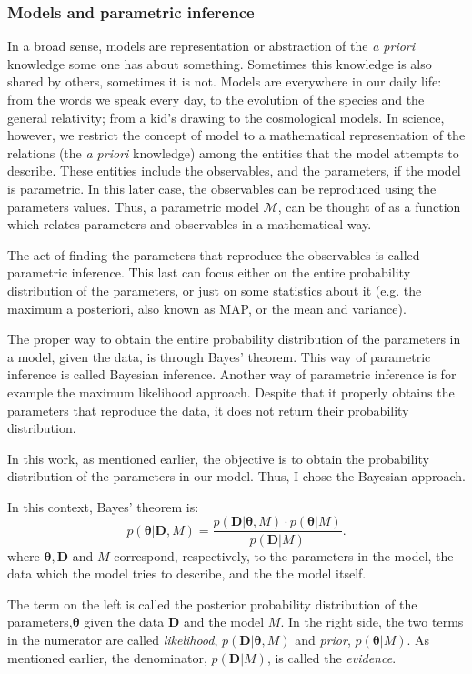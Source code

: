\subsubsection{Models and parametric inference}
In a broad sense, models are representation or abstraction of the \emph{a priori} knowledge some one has about something. Sometimes this knowledge is also shared by others, sometimes it is not. Models are everywhere in our daily life: from the words we speak every day, to the evolution of the species and the general relativity; from a kid's drawing to the cosmological models. In science, however, we restrict the concept of model to a mathematical representation of the relations (the \emph{a priori} knowledge) among the entities that the model attempts to describe. These entities include the observables, and the parameters, if the model is parametric. In this later case, the observables can be reproduced using the parameters values. Thus, a parametric model $\mathcal{M}$, can be thought of as a function which relates parameters and observables in a mathematical way. 

The act of finding the parameters that reproduce the observables is called parametric inference. This last can focus either on the entire probability distribution of the parameters, or just on some statistics about it (e.g. the maximum a posteriori, also known as MAP, or the mean and variance).

The proper way to obtain the entire probability distribution of the parameters in a model, given the data, is through Bayes' theorem. This way of parametric inference is called Bayesian inference. Another way of parametric inference is for example the maximum likelihood approach. Despite that it properly obtains the parameters that reproduce the data, it does not return their probability distribution.  

In this work, as mentioned earlier, the objective is to obtain the probability distribution of the parameters in our model. Thus, I chose the Bayesian approach. 

In this context, Bayes' theorem is:
\begin{equation}
p(\mathbf{\theta}|\mathbf{D},M) = \frac{p(\mathbf{D}|\mathbf{\theta},M)\cdot p(\mathbf{\theta}|M)}{p(\mathbf{D}|M)}.
\end{equation}
where $\mathbf{\theta},\mathbf{D}$ and $M$ correspond, respectively, to the parameters in the model, the data which the model tries 
to describe, and the the model itself. 

The term on the left is called the posterior probability distribution of the parameters,$\mathbf{\theta}$ given the data $\mathbf{D}$ and the model $M$. In the right side, the two terms in the numerator are called \emph{likelihood}, $p(\mathbf{D}|\mathbf{\theta},M)$ and \emph{prior}, $p(\mathbf{\theta}|M)$. As mentioned earlier, the denominator, $p(\mathbf{D}|M)$, is called the \emph{evidence}. 


